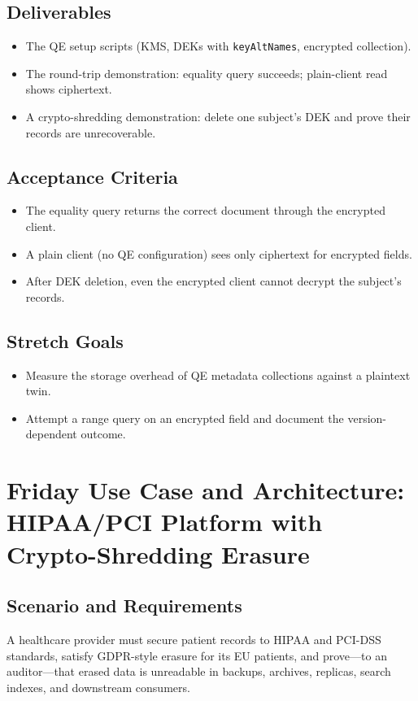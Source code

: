 \subsection*{Deliverables}
\begin{itemize}
    \item The QE setup scripts (KMS, DEKs with \texttt{keyAltNames}, encrypted collection).
    \item The round-trip demonstration: equality query succeeds; plain-client read shows ciphertext.
    \item A crypto-shredding demonstration: delete one subject's DEK and prove their records are unrecoverable.
\end{itemize}

\subsection*{Acceptance Criteria}
\begin{itemize}
    \item The equality query returns the correct document through the encrypted client.
    \item A plain client (no QE configuration) sees only ciphertext for encrypted fields.
    \item After DEK deletion, even the encrypted client cannot decrypt the subject's records.
\end{itemize}

\subsection*{Stretch Goals}
\begin{itemize}
    \item Measure the storage overhead of QE metadata collections against a plaintext twin.
    \item Attempt a range query on an encrypted field and document the version-dependent outcome.
\end{itemize}

\section{Friday Use Case and Architecture: HIPAA/PCI Platform with Crypto-Shredding Erasure}
\subsection{Scenario and Requirements}
A healthcare provider must secure patient records to HIPAA and PCI-DSS standards, satisfy GDPR-style erasure for its EU patients, and prove---to an auditor---that erased data is unreadable in backups, archives, replicas, search indexes, and downstream consumers.

